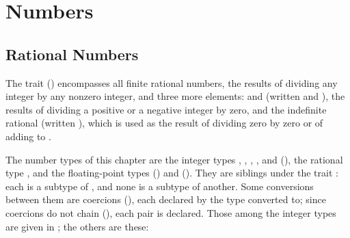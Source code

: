 %
%
%
%

\chapter{Numbers}


\section{Rational Numbers}

The trait  () encompasses all finite rational numbers,
the results of dividing any integer by any nonzero integer,
and three more elements:
\EXP{+\infty} and \EXP{-\infty} (written  and ),
the results of dividing a positive or a negative integer by zero,
and the indefinite rational (written ), which is used as the result
of dividing zero by zero or of adding \EXP{-\infty} to \EXP{+\infty}.

The number types of this chapter are
the integer types , , ,
, and  (),
the rational type ,
and the floating-point types  () and  ().
They are siblings under the trait :
each is a subtype of , and none is a subtype of another.
Some conversions between them are coercions (),
each declared by the type converted to;
since coercions do not chain (), each pair is declared.
Those among the integer types are given in ;
the others are these:


